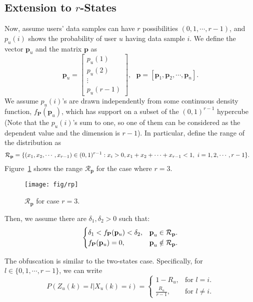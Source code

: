 \subsection{Extension to $r$-States}
Now, assume users' data samples can have $r$ possibilities $\left(0, 1, \cdots, r-1\right)$, and $p_u(i)$ shows the probability of user $u$ having data sample $i$. We define the vector $\textbf{p}_u$ and the matrix $\textbf{p}$ as
\[\textbf{p}_u= \begin{bmatrix}
p_u(1) \\ p_u(2) \\ \vdots \\p_u(r-1) \end{bmatrix} , \ \ \  \textbf{p} =\left[ \textbf{p}_{1}, \textbf{p}_{2}, \cdots,  \textbf{p}_{n}\right].
\]
We assume $p_u(i)$'s are drawn independently from some continuous density function, $f_\textbf{P}(\textbf{p}_u)$, which has support on a subset of the $(0,1)^{r-1}$ hypercube (Note that the $p_u(i)$'s sum to one, so one of them can be considered as the dependent value and the dimension is $r-1$). In particular, define the range of the distribution as
\begin{align}
\nonumber  \mathcal{R}_{\textbf{p}} &= \{ (x_1,x_2,  \cdots, x_{r-1}) \in (0,1)^{r-1}:  x_i > 0 , x_1+x_2+\cdots+x_{r-1} < 1,\ i=1, 2, \cdots, r-1\}.
\end{align}
Figure~\ref{fig:rp} shows the range $\mathcal{R}_{\textbf{p}}$ for the case where $r=3$.
\begin{figure}[h]
	\centering
	\texttt{[image: fig/rp]}
	\caption{$\mathcal{R}_{\textbf{p}}$ for case $r=3$.}
	\label{fig:rp}
\end{figure}


Then, we assume there are $\delta_1, \delta_2>0$ such that:
\begin{equation}
\begin{cases}
\nonumber    \delta_1<f_{\textbf{P}}(\mathbf{p}_u) <\delta_2, & \textbf{p}_u \in \mathcal{R}_{\textbf{p}}.\\
    f_{\textbf{P}}(\mathbf{p}_u)=0, &  \textbf{p}_u \notin \mathcal{R}_{\textbf{p}}.
\end{cases}
\end{equation}

The obfuscation is similar to the two-states case. Specifically, for $l \in \{0,1,\cdots, r-1\}$, we can write
\[
P({Z}_{u}(k)=l| X_{u}(k)=i) =\begin{cases}
1-R_u, & \textrm{for } l=i.\\
\frac{R_u}{r-1}, & \textrm{for } l \neq i.
\end{cases}
\]



